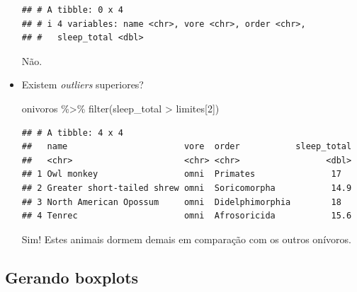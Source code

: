 \documentclass[
  11pt]{report}
\newenvironment{Shaded}{\begin{snugshade}}{\end{snugshade}}
\newcommand{\DecValTok}[1]{\textcolor[rgb]{0.00,0.00,0.81}{#1}}
\newcommand{\FunctionTok}[1]{\textcolor[rgb]{0.00,0.00,0.00}{#1}}
\newcommand{\NormalTok}[1]{#1}
\newcommand{\SpecialCharTok}[1]{\textcolor[rgb]{0.00,0.00,0.00}{#1}}
\renewenvironment{Shaded}{
    \begin{mdframed}[%
      roundcorner=2pt,%
      innerleftmargin=5pt,%
      innerrightmargin=5pt,%
      topline=true,%
      leftline=true,%
      rightline=true,%
      bottomline=true,%
      linewidth=0.5pt,%
      linecolor=black!20,%
      backgroundcolor=black!2,%
      skipabove=2ex,%
      skipbelow=2.5ex%
    ]%
  }
  {
    \end{mdframed}
  }
\begin{document}
\begin{itemize}
\begin{verbatim}
## # A tibble: 0 x 4
## # i 4 variables: name <chr>, vore <chr>, order <chr>,
## #   sleep_total <dbl>
\end{verbatim}

  Não.
\item
  Existem \emph{outliers} superiores?

\begin{Shaded}
\begin{Highlighting}[]
\NormalTok{onivoros }\SpecialCharTok{\%\textgreater{}\%} 
  \FunctionTok{filter}\NormalTok{(sleep\_total }\SpecialCharTok{\textgreater{}}\NormalTok{ limites[}\DecValTok{2}\NormalTok{])}
\end{Highlighting}
\end{Shaded}

\begin{verbatim}
## # A tibble: 4 x 4
##   name                       vore  order           sleep_total
##   <chr>                      <chr> <chr>                 <dbl>
## 1 Owl monkey                 omni  Primates               17  
## 2 Greater short-tailed shrew omni  Soricomorpha           14.9
## 3 North American Opossum     omni  Didelphimorphia        18  
## 4 Tenrec                     omni  Afrosoricida           15.6
\end{verbatim}

  Sim! Estes animais dormem demais em comparação com os outros onívoros.
\end{itemize}

\hypertarget{gerando-boxplots}{%
\subsection{Gerando boxplots}\label{gerando-boxplots}}
\end{document}
